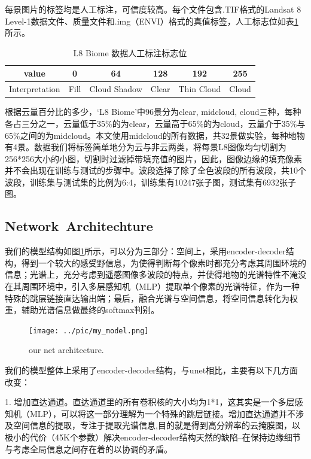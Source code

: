 \documentclass[UTF8]{ctexart}
\begin{document}
每景图片的标签均是人工标注，可信度较高。每个文件包含.TIF格式的Landsat 8 Level-1数据文件、质量文件和.img（ENVI）格式的真值标签，人工标志位如表\ref{BiomeFlag}所示。

\begin{table}[H]
    \centering
    \begin{tabular}{c|ccccc}
    \hline
    \hline
    value& 0& 64& 128& 192& 255\\
    \hline
    Interpretation&	Fill& Cloud Shadow& Clear &Thin Cloud& Cloud\\
    \hline
    \hline
    \end{tabular}
    \caption{L8 Biome 数据人工标注标志位}
    \label{BiomeFlag}
    \end{table}

根据云量百分比的多少，‘L8 Biome’中96景分为clear, midcloud, cloud三种，每种各占三分之一，云量低于35\%的为clear，云量高于65\%的为cloud，云量介于35\%与65\%之间的为midcloud。本文使用midcloud的所有数据，共32景做实验，每种地物有4景。数据我们将标签简单地分为云与非云两类，将每景L8图像均匀切割为256*256大小的小图，切割时过滤掉带填充值的图片，因此，图像边缘的填充像素并不会出现在训练与测试的步骤中。波段选择了除了全色波段的所有波段，共10个波段，训练集与测试集的比例为6:4，训练集有10247张子图，测试集有6932张子图。

\subsection{Network Architechture}

我们的模型结构如图\ref{fig_myModel}所示，可以分为三部分：空间上，采用encoder-decoder结构，得到一个较大的感受野信息，为使得判断每个像素时都充分考虑其周围环境的信息；光谱上，充分考虑到遥感图像多波段的特点，并使得地物的光谱特性不淹没在其周围环境中，引入多层感知机（MLP）提取单个像素的光谱特征，作为一种特殊的跳层链接直达输出端；最后，融合光谱与空间信息，将空间信息转化为权重，辅助光谱信息做最终的softmax判别。
\begin{figure}[H]
    \centering
    \texttt{[image: ../pic/my\_model.png]}
    \caption{our net architecture.}
    \label{fig_myModel}
\end{figure}

我们的模型整体上采用了encoder-decoder结构，与unet相比，主要有以下几方面改变：

1. 增加直达通道。直达通道里的所有卷积核的大小均为1*1，这其实是一个多层感知机（MLP），可以将这一部分理解为一个特殊的跳层链接。增加直达通道并不涉及空间信息的提取，专注于提取光谱信息,目的就是得到高分辨率的云掩膜图，以极小的代价（45K个参数）解决encoder-decoder结构天然的缺陷--在保持边缘细节与考虑全局信息之间存在着的以协调的矛盾。
\end{document}
